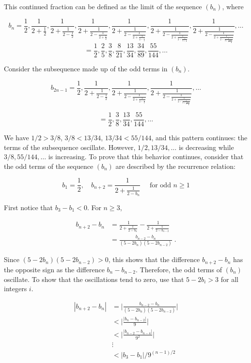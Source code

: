 \documentclass[a4paper]{article}
\begin{document}
\begin{enumerate}
This continued fraction can be defined as the limit of the sequence $(b_n)$, where

$$
b_n = 
\frac{1}{2}, \frac{1}{2+\frac{1}{2}},
\frac{1}{2+\frac{1}{2-\frac{1}{2}}},
\frac{1}{2+\frac{1}{2-\frac{1}{2+\frac{1}{2}}}},
\frac{1}{2+\frac{1}{2-\frac{1}{2+\frac{1}{2-\frac{1}{2}}}}},
\frac{1}{2+\frac{1}{2-\frac{1}{2+\frac{1}{2-\frac{1}{2+\frac{1}{2}}}}}},
\frac{1}{2+\frac{1}{2-\frac{1}{2+\frac{1}{2-\frac{1}{2+\frac{1}{2-\frac{1}{2}}}}}}},
\dots
$$
$$
= \frac{1}{2}, \frac{2}{5}, \frac{3}{8}, \frac{8}{21}, \frac{13}{34},
\frac{34}{89}, \frac{55}{144}, \dots
$$

Consider the subsequence made up of the odd terms in $(b_n)$.

$$
b_{2n-1} = 
\frac{1}{2}, 
\frac{1}{2+\frac{1}{2-\frac{1}{2}}},
\frac{1}{2+\frac{1}{2-\frac{1}{2+\frac{1}{2-\frac{1}{2}}}}},
\frac{1}{2+\frac{1}{2-\frac{1}{2+\frac{1}{2-\frac{1}{2+\frac{1}{2-\frac{1}{2}}}}}}},
\dots
$$

$$
= \frac{1}{2}, \frac{3}{8}, \frac{13}{34}, \frac{55}{144}, \dots
$$

We have $1/2 > 3/8$, $3/8 < 13/34$, $13/34 < 55/144$, and this pattern continues: the terms of the subsequence oscillate. However, $1/2, 13/34, \dots$ is decreasing while $3/8, 55/144, \dots$ is increasing. To prove that this behavior continues, consider that the odd terms of the sequence $(b_n)$ are described by the recurrence relation:

$$b_1 = \frac{1}{2},
\quad b_{n+2} = 
\frac{1}{2+\frac{1}{2-b_n}}
\quad \text{ for odd } n \geq 1
$$

First notice that $b_3 - b_1 < 0$. For $n \geq 3$,

\begin{align*}
b_{n+2} - b_n &=
\frac{1}{2+\frac{1}{2-b_n}} - \frac{1}{2+\frac{1}{2-b_{n-2}}} \\
&= \frac{b_{n-2} - b_n}{(5-2b_n)(5-2b_{n-2})} \;.
\end{align*}

Since $(5-2b_n)(5-2b_{n-2}) > 0$, this shows that the difference $b_{n+2} - b_n$ has the opposite sign as the difference $b_n - b_{n-2}$. Therefore, the odd terms of $(b_n)$ oscillate. To show that the oscillations tend to zero, use that $5-2b_i > 3 $ for all integers $i$.

\begin{align*}
|b_{n+2} - b_n| &=
\biggr\rvert \frac{b_{n-2} - b_n}{(5-2b_n)(5-2b_{n-2})} \biggr\rvert \\
& < \biggr\rvert \frac{|b_n - b_{n-2}|}{9} \biggr\rvert \\
& < \biggr\rvert \frac{|b_{n-2} - b_{n-4}|}{9^2} \biggr\rvert \\
& \vdots \\
& < |b_3 - b_1| / 9^{(n-1)/2}
\end{align*}


\end{enumerate}
\end{document}
